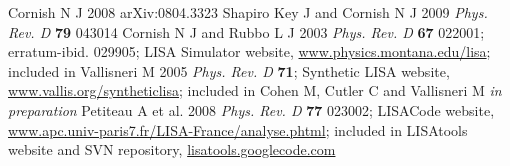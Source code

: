 \documentclass{iopart}
\begin{document}
\begin{thebibliography}{99}
%
 Cornish N J 2008 arXiv:0804.3323
%
 Shapiro Key J and Cornish N J 2009 \textit{Phys. Rev. D} \textbf{79} 043014
%
 Cornish N J and Rubbo L J 2003 \textit{Phys. Rev. D} \textbf{67} 022001; erratum-ibid. 029905; LISA Simulator website, \url{www.physics.montana.edu/lisa}; included in \cite{lisatools}
%
 Vallisneri M 2005 \textit{Phys. Rev. D} \textbf{71}; Synthetic LISA website, \url{www.vallis.org/syntheticlisa}; included in \cite{lisatools}
%
 Cohen M, Cutler C and Vallisneri M \textit{in preparation}
%
 Petiteau A et al. 2008 \textit{Phys. Rev. D} \textbf{77} 023002; LISACode website, \url{www.apc.univ-paris7.fr/LISA-France/analyse.phtml}; included in \cite{lisatools}
%
 LISAtools website and SVN repository, \url{lisatools.googlecode.com}

\end{thebibliography}
\end{document}
